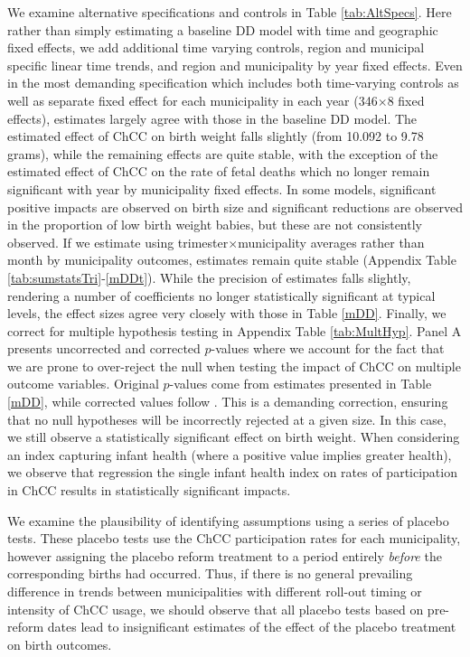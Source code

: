 \documentclass[12pt]{article}
\begin{document}
\begin{spacing}{1.4}
We examine alternative specifications and controls in Table
\ref{tab:AltSpecs}.  Here rather than simply estimating a baseline
DD model with time and geographic fixed effects, we add additional
time varying controls, region and municipal specific linear time
trends, and region and municipality by year fixed effects.  Even in
the most demanding specification which includes both time-varying
controls as well as separate fixed effect for each municipality in
each year (346$\times$8 fixed effects), estimates largely agree
with those in the baseline DD model.  The estimated effect of ChCC
on birth weight falls slightly (from 10.092 to 9.78 grams), while the remaining
effects are quite stable, with the exception of the estimated effect
of ChCC on the rate of fetal deaths which no longer remain significant
with year by municipality fixed effects.  In some models,
significant positive impacts are observed on birth size and
significant reductions are observed in the proportion of low birth
weight babies, but these are not consistently observed. 
If we estimate using trimester$\times$municipality averages rather
than month by municipality outcomes, estimates remain quite stable
(Appendix Table \ref{tab:sumstatsTri}-\ref{mDDt}).  While the precision of
estimates falls slightly, rendering a number of coefficients no longer
statistically significant at typical levels, the effect sizes agree
very closely with those in Table \ref{mDD}. %
Finally, we correct for multiple hypothesis testing in Appendix
Table \ref{tab:MultHyp}.  Panel A presents uncorrected and
corrected $p$-values where we account for the fact that we are
prone to over-reject the null when testing the impact of ChCC
on multiple outcome variables.  Original $p$-values come from
estimates presented in Table \ref{mDD}, while corrected values
follow \citet{RomanoWolf2005,RomanoWolf2016}.  This is a demanding correction,
ensuring that no null hypotheses will be incorrectly rejected
at a given size.  In this case, we still observe a statistically
significant effect on birth weight.  When considering an index
capturing infant health (where a positive value implies greater
health), we observe that regression the single infant health index on rates
of participation in ChCC results in statistically significant
impacts.

We examine the plausibility of identifying assumptions using a
series of placebo tests.  These placebo tests use the ChCC
participation rates for each municipality, however assigning the
placebo reform treatment to a period entirely \emph{before} the
corresponding births had occurred.  Thus, if there is no general
prevailing difference in trends between municipalities with different
roll-out timing or intensity of ChCC usage, we should observe
that all placebo tests based on pre-reform dates lead to
insignificant estimates of the effect of the placebo treatment on
birth outcomes.


\end{spacing}
\end{document}
